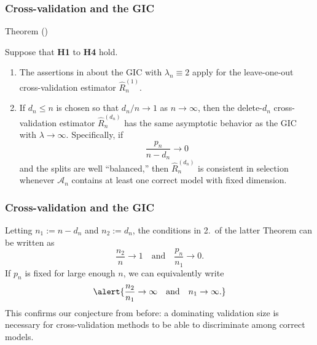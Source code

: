 \documentclass{beamer}
\newcommand{\0}{\emptyset}
\newcommand{\Acal}{\mathcal{A}_{n}}
\newcommand{\1}{\mathmybb{1}}
\begin{document}
\begin{frame}
  \frametitle{Cross-validation and the GIC}
  \begin{block}{Theorem (\cite{shao_1997})}
    
    Suppose that \textbf{H1} to \textbf{H4} hold.
    
    \begin{enumerate}
      \item The assertions in about the GIC with \(\lambda_{n}\equiv 2\) apply for the leave-one-out cross-validation estimator \(\hat{R}_{n}^{(1)}\).
      \item If \(d_{n}\leq n\) is chosen so that \(d_{n}/n\to1\) as \(n\to\infty\), then the delete-\(d_{n}\) cross-validation estimator \(\hat{R}_{n}^{(d_{n})}\) has the same asymptotic behavior as the GIC with \(\lambda\to\infty\). Specifically, if \[\frac{p_{n}}{n-d_{n}}\to 0\] and the splits are well ``balanced,'' then \(\hat{R}_{n}^{(d_{n})}\) is consistent in selection whenever \(\Acal\) contains at least one correct model with fixed dimension.
    \end{enumerate}
  \end{block}
    
\end{frame}

\begin{frame}
  \frametitle{Cross-validation and the GIC}
  Letting \(n_{1}:=n-d_{n}\)  and \(n_{2}:=d_{n}\), the conditions in 2.\ of the latter Theorem can be written as 
\[\frac{n_{2}}{n}\to 1\quad\text{and}\quad \frac{p_{n}}{n_{1}}\to 0.\]
If \(p_{n}\) is fixed for large enough \(n\), we can equivalently write
\begin{equation}\label{eq:lmsplitcond}
    \alert{\frac{n_{2}}{n_{1}}\to\infty\quad\text{and}\quad n_{1}\to \infty.}
\end{equation}
This confirms our conjecture from before: a dominating validation size is necessary for cross-validation methods to be able to discriminate among correct models.

\end{frame}
\end{document}
